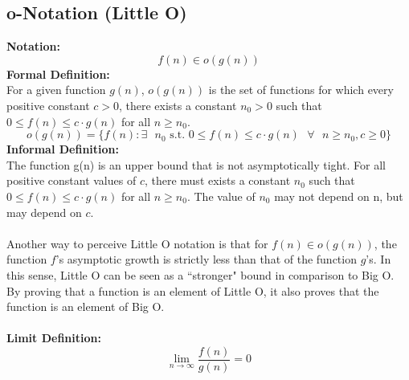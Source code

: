\subsection{o-Notation (Little O)}
\textbf{Notation:}
$$
f(n) \in o(g(n))
$$
\textbf{Formal Definition:}\\
For a given function $g(n)$, $o(g(n))$ is the set  of functions for which every positive constant $c > 0$, there exists a constant $n_0 > 0$ such that $0 \leq f(n) \leq c \cdot g(n)$ for all $n \geq n_0$.
$$
o(g(n)) = \{ f(n) : \exists \text{ } n_0 \text{ s.t. } 0 \leq f(n) \leq c \cdot g(n) \text{ } \forall \text{ } n \geq n_0, c \geq 0 \}
$$
\textbf{Informal Definition:}\\
The function g(n) is an upper bound that is not asymptotically tight. For all positive constant values of $c$, there must exists a constant $n_0$ such that $0 \leq f(n) \leq c \cdot g(n)$ for all $n \geq n_0$. The value of $n_0$ may not depend on n, but may depend on $c$.\\\\
Another way to perceive Little O notation is that for $f(n) \in o(g(n))$, the function $f$'s asymptotic growth is strictly less than that of the function $g$'s. In this sense, Little O can be seen as a ``stronger" bound in comparison to Big O. By proving that a function is an element of Little O, it also proves that the function is an element of Big O.\\\\
\textbf{Limit Definition:}
$$
\lim\limits_{n\to\infty} \frac{f(n)}{g(n)} = 0
$$